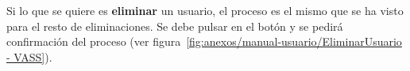 Si lo que se quiere es \textbf{eliminar} un usuario, el proceso es el mismo que
se ha visto para el resto de eliminaciones. Se debe pulsar en el botón
\button[vassred]{\faTrash} y se pedirá confirmación del proceso (ver
figura~\ref{fig:anexos/manual-usuario/EliminarUsuario - VASS}).

